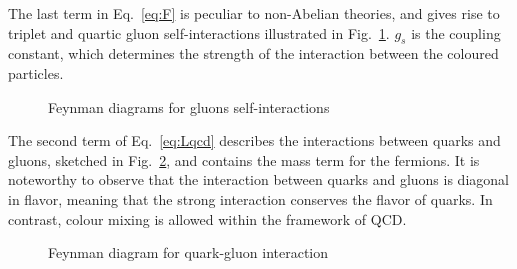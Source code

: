 The last term in Eq.~\ref{eq:F} is peculiar to non-Abelian theories, and gives rise to triplet and quartic gluon self-interactions illustrated in Fig.~\ref{fig:Feynman-gluons}. $g_s$ is the coupling constant, which determines the strength of the interaction between the coloured particles.

\begin{figure}[htb]
    \centering
     \qquad
    \caption{Feynman diagrams for gluons self-interactions}
    \label{fig:Feynman-gluons}
\end{figure}

The second term of Eq.~\ref{eq:Lqcd} describes the interactions between quarks and gluons, sketched in Fig.~\ref{fig:Feynman_q_g}, and contains the mass term for the fermions. It is noteworthy to observe that the interaction between quarks and gluons is diagonal in flavor, meaning that the strong interaction conserves the flavor of quarks. In contrast, colour mixing is allowed within the framework of QCD.

\begin{figure}[htb]
    \centering
    \caption{Feynman diagram for quark-gluon interaction}
    \label{fig:Feynman_q_g}
\end{figure}

